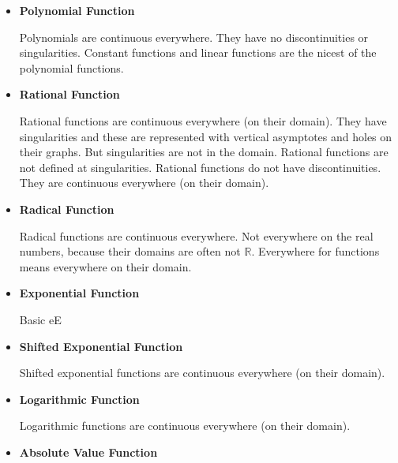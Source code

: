 \documentclass{ximera}
\begin{document}
\begin{itemize} 

\item \textbf{\textcolor{blue!55!black}{Polynomial Function}} 


Polynomials are continuous everywhere. They have no discontinuities or singularities. Constant functions and linear functions are the nicest of the polynomial functions.





\item \textbf{\textcolor{blue!55!black}{Rational Function}} 

Rational functions are continuous everywhere (on their domain).  They have singularities and these are represented with vertical asymptotes and holes on their graphs.  But singularities are not in the domain.  Rational functions are not defined at singularities. Rational functions do not have discontinuities.  They are continuous everywhere (on their domain). 




\item \textbf{\textcolor{blue!55!black}{Radical Function}} 

Radical functions are continuous everywhere.  Not everywhere on the real numbers, because their domains are often not $\mathbb{R}$. Everywhere for functions means everywhere on their domain.






\item \textbf{\textcolor{blue!55!black}{Exponential Function}} 

Basic eE




\item \textbf{\textcolor{blue!55!black}{Shifted Exponential Function}} 

Shifted exponential functions are continuous everywhere (on their domain).




\item \textbf{\textcolor{blue!55!black}{Logarithmic Function}} 

Logarithmic functions are continuous everywhere (on their domain).









\item \textbf{\textcolor{blue!55!black}{Absolute Value Function}} 


\end{itemize}
\end{document}
